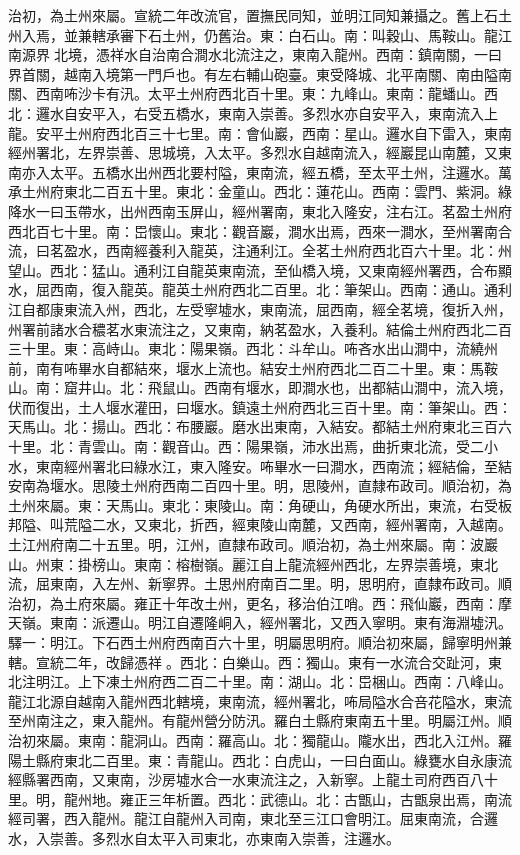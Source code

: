 \begin{pinyinscope}
治初，為土州來屬。宣統二年改流官，置撫民同知，並明江同知兼攝之。舊上石土州入焉，並兼轄承審下石土州，仍舊治。東：白石山。南：叫穀山、馬鞍山。龍江南源界北境，憑祥水自治南合澗水北流注之，東南入龍州。西南：鎮南關，一曰界首關，越南入境第一門戶也。有左右輔山砲臺。東受降城、北平南關、南由隘南關、西南咘沙卡有汛。太平土州府西北百十里。東：九峰山。東南：龍蟠山。西北：邏水自安平入，右受五橋水，東南入崇善。多烈水亦自安平入，東南流入上龍。安平土州府西北百三十七里。南：會仙巖，西南：星山。邏水自下雷入，東南經州署北，左界崇善、思城境，入太平。多烈水自越南流入，經巖昆山南麓，又東南亦入太平。五橋水出州西北要村隘，東南流，經五橋，至太平土州，注邏水。萬承土州府東北二百五十里。東北：金童山。西北：蓮花山。西南：雲門、紫洞。綠降水一曰玉帶水，出州西南玉屏山，經州署南，東北入隆安，注右江。茗盈土州府西北百七十里。南：岊懷山。東北：觀音巖，澗水出焉，西來一澗水，至州署南合流，曰茗盈水，西南經養利入龍英，注通利江。全茗土州府西北百六十里。北：州望山。西北：猛山。通利江自龍英東南流，至仙橋入境，又東南經州署西，合布顯水，屈西南，復入龍英。龍英土州府西北二百里。北：筆架山。西南：通山。通利江自都康東流入州，西北，左受寧墟水，東南流，屈西南，經全茗境，復折入州，州署前諸水合穠茗水東流注之，又東南，納茗盈水，入養利。結倫土州府西北二百三十里。東：高峙山。東北：陽果嶺。西北：斗牟山。咘吝水出山澗中，流繞州前，南有咘畢水自都結來，堰水上流也。結安土州府西北二百二十里。東：馬鞍山。南：窟井山。北：飛鼠山。西南有堰水，即澗水也，出都結山澗中，流入境，伏而復出，土人堰水灌田，曰堰水。鎮遠土州府西北三百十里。南：筆架山。西：天馬山。北：揚山。西北：布腰巖。磨水出東南，入結安。都結土州府東北三百六十里。北：青雲山。南：觀音山。西：陽果嶺，沛水出焉，曲折東北流，受二小水，東南經州署北曰綠水江，東入隆安。咘畢水一曰澗水，西南流；經結倫，至結安南為堰水。思陵土州府西南二百四十里。明，思陵州，直隸布政司。順治初，為土州來屬。東：天馬山。東北：東陵山。南：角硬山，角硬水所出，東流，右受板邦隘、叫荒隘二水，又東北，折西，經東陵山南麓，又西南，經州署南，入越南。土江州府南二十五里。明，江州，直隸布政司。順治初，為土州來屬。南：波巖山。州東：掛榜山。東南：榕樹嶺。麗江自上龍流經州西北，左界崇善境，東北流，屈東南，入左州、新寧界。土思州府南百二里。明，思明府，直隸布政司。順治初，為土府來屬。雍正十年改土州，更名，移治伯江哨。西：飛仙巖，西南：摩天嶺。東南：派遷山。明江自遷隆峒入，經州署北，又西入寧明。東有海淵墟汛。驛一：明江。下石西土州府西南百六十里，明屬思明府。順治初來屬，歸寧明州兼轄。宣統二年，改歸憑祥。西北：白樂山。西：獨山。東有一水流合交趾河，東北注明江。上下凍土州府西二百二十里。南：湖山。北：岊梱山。西南：八峰山。龍江北源自越南入龍州西北轄境，東南流，經州署北，咘局隘水合咅花隘水，東流至州南注之，東入龍州。有龍州營分防汛。羅白土縣府東南五十里。明屬江州。順治初來屬。東南：龍洞山。西南：羅高山。北：獨龍山。隴水出，西北入江州。羅陽土縣府東北二百里。東：青龍山。西北：白虎山，一曰白面山。綠甕水自永康流經縣署西南，又東南，沙房墟水合一水東流注之，入新寧。上龍土司府西百八十里。明，龍州地。雍正三年析置。西北：武德山。北：古甑山，古甑泉出焉，南流經司署，西入龍州。龍江自龍州入司南，東北至三江口會明江。屈東南流，合邏水，入崇善。多烈水自太平入司東北，亦東南入崇善，注邏水。


\end{pinyinscope}
